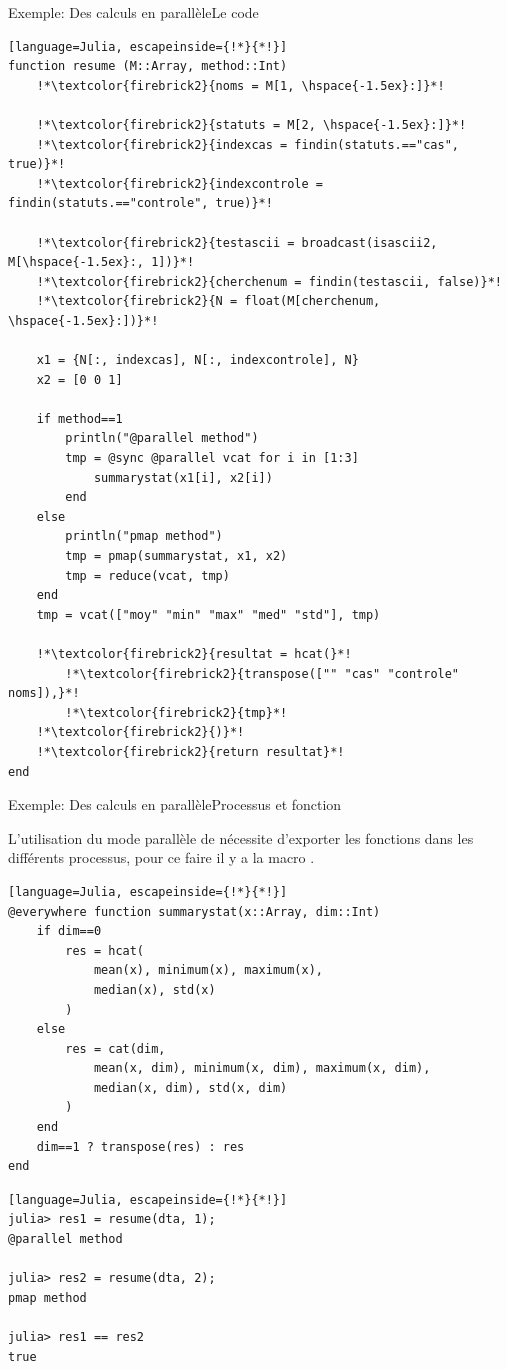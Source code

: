 \begin{frame}[containsverbatim]{\textcolor{goldenrod2}{Exemple:} Des calculs en parallèle}{Le code}
\vspace{-1ex}
\begin{lstlisting}[language=Julia, escapeinside={!*}{*!}]
function resume (M::Array, method::Int)
    !*\textcolor{firebrick2}{noms = M[1, \hspace{-1.5ex}:]}*!

    !*\textcolor{firebrick2}{statuts = M[2, \hspace{-1.5ex}:]}*!
    !*\textcolor{firebrick2}{indexcas = findin(statuts.=="cas", true)}*!
    !*\textcolor{firebrick2}{indexcontrole = findin(statuts.=="controle", true)}*!

    !*\textcolor{firebrick2}{testascii = broadcast(isascii2, M[\hspace{-1.5ex}:, 1])}*!
    !*\textcolor{firebrick2}{cherchenum = findin(testascii, false)}*!
    !*\textcolor{firebrick2}{N = float(M[cherchenum, \hspace{-1.5ex}:])}*!

    x1 = {N[:, indexcas], N[:, indexcontrole], N}
    x2 = [0 0 1]

    if method==1
        println("@parallel method")
        tmp = @sync @parallel vcat for i in [1:3]
            summarystat(x1[i], x2[i])
        end
    else
        println("pmap method")
        tmp = pmap(summarystat, x1, x2)
        tmp = reduce(vcat, tmp)
    end
    tmp = vcat(["moy" "min" "max" "med" "std"], tmp)

    !*\textcolor{firebrick2}{resultat = hcat(}*!
        !*\textcolor{firebrick2}{transpose(["" "cas" "controle" noms]),}*!
        !*\textcolor{firebrick2}{tmp}*!
    !*\textcolor{firebrick2}{)}*!
    !*\textcolor{firebrick2}{return resultat}*!
end
\end{lstlisting}
\end{frame}


\begin{frame}[containsverbatim]{\textcolor{goldenrod2}{Exemple:} Des calculs en parallèle}{Processus et fonction}
\par{L'utilisation du mode parallèle de {\Julia} nécessite d'exporter les fonctions dans les différents processus, pour ce faire il y a la macro .}
\begin{lstlisting}[language=Julia, escapeinside={!*}{*!}]
@everywhere function summarystat(x::Array, dim::Int)
    if dim==0
        res = hcat(
            mean(x), minimum(x), maximum(x),
            median(x), std(x)
        )
    else
        res = cat(dim,
            mean(x, dim), minimum(x, dim), maximum(x, dim),
            median(x, dim), std(x, dim)
        )
    end
    dim==1 ? transpose(res) : res
end
\end{lstlisting}
\vspace{-2ex}
\begin{lstlisting}[language=Julia, escapeinside={!*}{*!}]
julia> res1 = resume(dta, 1);
@parallel method

julia> res2 = resume(dta, 2);
pmap method

julia> res1 == res2
true
\end{lstlisting}
\end{frame}


